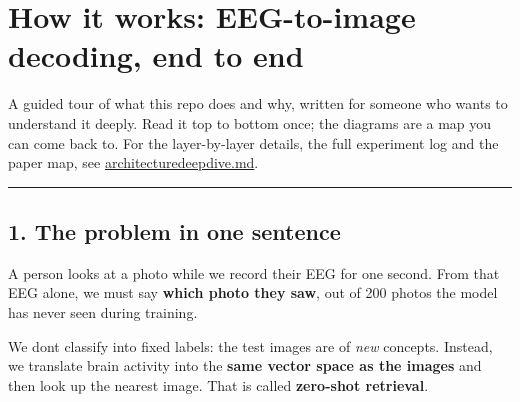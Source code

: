 \documentclass[
  11pt,
]{article}
\author{}
\date{}
\renewcommand{\_}{\oldunderscore\allowbreak}
\begin{document}
{
\setcounter{tocdepth}{3}
\tableofcontents
}
\section{How it works: EEG-to-image
decoding, end to
end}\label{how-it-works-eeg-to-image-decoding-end-to-end}

A guided tour of what this repo does and
why, written for someone who wants to
understand it deeply. Read it top to
bottom once; the diagrams are a map you
can come back to. For the layer-by-layer
details, the full experiment log and the
paper map, see
\href{architecture_deep_dive.pdf}{architecture\_deep\_dive.md}.

\begin{center}\rule{0.5\linewidth}{0.5pt}\end{center}

\subsection{1. The problem in one
sentence}\label{the-problem-in-one-sentence}

A person looks at a photo while we
record their EEG for one second. From
that EEG alone, we must say
\textbf{which photo they saw}, out of
200 photos the model has never seen
during training.

We don\textquotesingle t classify into
fixed labels: the test images are of
\emph{new} concepts. Instead, we
translate brain activity into the
\textbf{same vector space as the images}
and then look up the nearest image. That
is called \textbf{zero-shot retrieval}.
\end{document}
